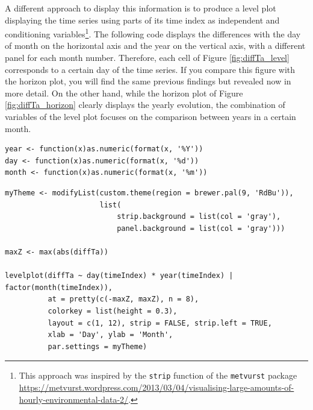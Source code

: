 A different approach to display this information is to produce a level
plot displaying the time series using parts of its time index as
independent and conditioning variables\footnote{This approach was inspired by the \texttt{strip} function of the
\texttt{metvurst} package
\url{https://metvurst.wordpress.com/2013/03/04/visualising-large-amounts-of-hourly-environmental-data-2/}.}. The following code
displays the differences with the day of month on the horizontal axis
and the year on the vertical axis, with a different panel for each
month number. Therefore, each cell of Figure \ref{fig:diffTa_level}
corresponds to a certain day of the time series. If you compare this
figure with the horizon plot, you will find the same previous findings
but revealed now in more detail. On the other hand, while the horizon
plot of Figure \ref{fig:diffTa_horizon} clearly displays the yearly
evolution, the combination of variables of the level plot focuses on
the comparison between years in a certain month.

\lstset{language=r,label= ,caption= ,captionpos=b,numbers=none}
\begin{lstlisting}
year <- function(x)as.numeric(format(x, '%Y'))
day <- function(x)as.numeric(format(x, '%d'))
month <- function(x)as.numeric(format(x, '%m'))
\end{lstlisting}

\lstset{language=r,label= ,caption= ,captionpos=b,numbers=none}
\begin{lstlisting}
myTheme <- modifyList(custom.theme(region = brewer.pal(9, 'RdBu')),
                      list(
                          strip.background = list(col = 'gray'),
                          panel.background = list(col = 'gray')))

maxZ <- max(abs(diffTa))

levelplot(diffTa ~ day(timeIndex) * year(timeIndex) | factor(month(timeIndex)),
          at = pretty(c(-maxZ, maxZ), n = 8),
          colorkey = list(height = 0.3),
          layout = c(1, 12), strip = FALSE, strip.left = TRUE,
          xlab = 'Day', ylab = 'Month', 
          par.settings = myTheme)

\end{lstlisting}

